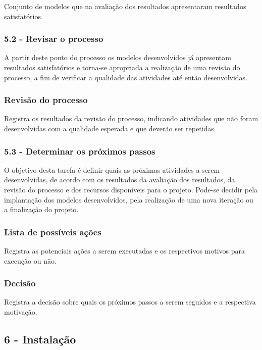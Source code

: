 Conjunto de modelos que na avaliação dos resultados apresentaram resultados satisfatórios.

\subsubsection*{\textbf{5.2 - Revisar o processo}}

A partir deste ponto do processo os modelos desenvolvidos já apresentam resultados satisfatórios e torna-se apropriada a realização de uma revisão do processo, a fim de verificar a qualidade das atividades até então desenvolvidas.

\subsubsection*{Revisão do processo}

Registra os resultados da revisão do processo, indicando atividades que não foram desenvolvidas com a qualidade esperada e que deverão ser repetidas.

\subsubsection*{\textbf{5.3 - Determinar os próximos passos}}

O objetivo desta tarefa é definir quais as próximas atividades a serem desenvolvidas, de acordo com os resultados da avaliação dos resultados, da revisão do processo e dos recursos disponíveis para o projeto. Pode-se decidir pela implantação dos modelos desenvolvidos, pela realização de uma nova iteração ou a finalização do projeto.

\subsubsection*{Lista de possíveis ações}

Registra as potenciais ações a serem executadas e os respectivos motivos para execução ou não.

\subsubsection*{Decisão}

Registra a decisão sobre quais os próximos passos a serem seguidos e a respectiva motivação.

\newpage 

\subsection*{6 - Instalação}

